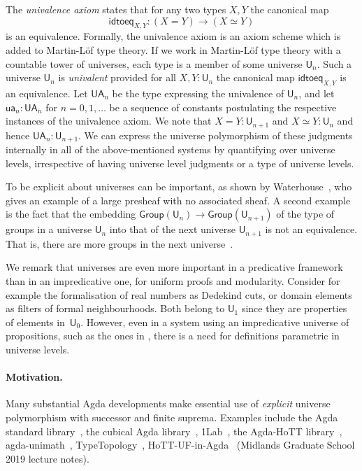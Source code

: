 \documentclass[a4paper,UKenglish,cleveref, autoref, thm-restate]{lipics-v2021}
\newcommand{\UU}{\mathsf{U}}
\newcommand{\Group}{\mathsf{Group}}
\newcommand{\idtoeq}{\mathsf{idtoeq}}
\newcommand{\ua}{\mathsf{ua}}
\newcommand{\UA}{\mathsf{UA}}
\begin{document}
The \emph{univalence axiom} states that for any two types $X,Y$ the canonical map
$$
\idtoeq_{X,Y} : (X=Y)\to (X\simeq Y)
$$
is an equivalence.
Formally, the univalence axiom is an axiom scheme which is added to
Martin-Löf type theory.
If we work in Martin-Löf type theory with a countable tower of universes,
each type is a member of some universe $\UU_n$.
Such a universe $\UU_n$ is {\em univalent} provided for all $X,Y : \UU_n$ the
canonical map $\idtoeq_{X,Y}$ is an equivalence.
Let $\UA_n$ be the type expressing the univalence of $\UU_n$, and let
$\ua_n : \UA_n$ for $n = 0,1,\ldots$ be a sequence of constants postulating
the respective instances of the univalence axiom.
We note that $X = Y : \UU_{n+1}$ and $X\simeq Y : \UU_n$ and
hence $\UA_n : \UU_{n+1}$. We can express the universe polymorphism of these judgments internally in all of the above-mentioned systems by quantifying over universe levels, irrespective of having universe level judgments or a type of universe levels.

To be explicit about universes can be important, as shown by Waterhouse~\cite{waterhouse:sheaves,chambert-loir:universes-matter}, who gives an example of a large presheaf with no associated sheaf. A second example is the fact that the embedding
 $\Group(\UU_n)\rightarrow \Group(\UU_{n+1})$ of the type of groups in a universe $\UU_n$ into that of the next universe $\UU_{n+1}$ is not an equivalence. That is, there are more groups in the next universe~\cite{bcde:largegroup}.

 We remark that universes are even more important in a predicative framework
than in an impredicative one, for uniform proofs and modularity.
Consider for example the formalisation of real numbers as Dedekind cuts,
or domain elements as filters of formal neighbourhoods. Both belong to $\UU_1$ since they are properties of elements in~$\UU_0$.
However, even in a system using an impredicative universe of propositions,
such as the ones in \cite{Huet87,moura:lean}, there is a need for
definitions parametric in universe levels.

\paragraph{Motivation.}
Many substantial Agda developments make essential use of \emph{explicit} universe polymorphism with successor and finite suprema. Examples include the Agda standard library~\cite{agda:stdlib}, the cubical Agda library~\cite{cubical:agda}, 1Lab~\cite{agda:1lab}, the Agda-HoTT library~\cite{hott:agda}, agda-unimath~\cite{agda:unimath}, TypeTopology~\cite{TypeTopology}, 
HoTT-UF-in-Agda~\cite{hott:uf:in:agda} (Midlands Graduate School 2019 lecture notes).
\end{document}
